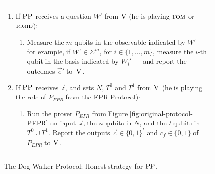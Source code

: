\documentclass[11pt,letter]{article}
\theoremstyle{remark}
\theoremstyle{definition}
\newcommand{\rigid}{\textsc{rigid}}
\newcommand{\tom}{\textsc{tom}}
\newcommand{\ver}{\textsc{V}}
\newcommand{\pp}{\textsc{PP}}
\begin{document}
\begin{figure}[H]
\rule[1ex]{16.5cm}{0.5pt}
\vspace{-20pt}
\begin{enumerate}
  \item If $\pp$ receives a question ${W}'$ from $\ver$ (he is playing $\tom$ or $\rigid$):
\begin{enumerate}
     \item[]  Measure the $m$ qubits in the observable indicated by $W'$ --- for example, if $W'\in\Sigma^m$, for $i\in \{1,\ldots,m\}$, measure the $i$-th qubit in the basis indicated by $W_i'$ --- and report
       the outcomes $\vec{e}'$ to~$\ver$.
\end{enumerate}
\item If $\pp$ receives $\vec{z}$, and sets $N$, $T^0$ and $T^1$ from $\ver$ (he is playing the role of $P_{EPR}$ from the EPR Protocol):
\begin{enumerate}
     \item[] Run the prover $P_{EPR}$ from Figure \ref{fig:original-protocol-PEPR} on input $\vec{z}$, the $n$ qubits in $N$, and the $t$ qubits in $T^0\cup T^1$.
     Report the outputs $\vec{c}\in\{0,1\}^t$ and $c_f\in\{0,1\}$ of $P_{EPR}$  to $\ver$. %
\end{enumerate}
\end{enumerate}
\rule[2ex]{16.5cm}{0.5pt}\vspace{-.5cm}
\caption{The Dog-Walker Protocol: Honest strategy for $\pp$.}\label{fig:dogwalker-protocol-PP}
\end{figure}
\end{document}
